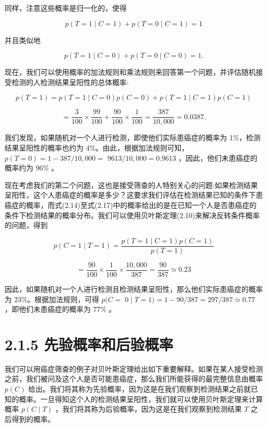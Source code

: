 \documentclass[10pt]{article}
\begin{document}
同样，注意这些概率是归一化的，使得

\[
p\left( {T = 1 \mid  C = 1}\right)  + p\left( {T = 0 \mid  C = 1}\right)  = 1 \tag{2.18}
\]

并且类似地

\[
p\left( {T = 1 \mid  C = 0}\right)  + p\left( {T = 0 \mid  C = 0}\right)  = 1. \tag{2.19}
\]

现在，我们可以使用概率的加法规则和乘法规则来回答第一个问题，并评估随机接受检测的人检测结果呈阳性的总体概率:

\[
p\left( {T = 1}\right)  = p\left( {T = 1 \mid  C = 0}\right) p\left( {C = 0}\right)  + p\left( {T = 1 \mid  C = 1}\right) p\left( {C = 1}\right)
\]

\[
= \frac{3}{100} \times  \frac{99}{100} + \frac{90}{100} \times  \frac{1}{100} = \frac{387}{{10},{000}} = {0.0387}. \tag{2.20}
\]

我们发现，如果随机对一个人进行检测，即使他们实际患癌症的概率为 1\%，检测结果呈阳性的概率也约为 4\%。由此，根据加法规则可知， \(p\left( {T = 0}\right)  = 1 - {387}/{10},{000} =\)  \({9613}/{10},{000} = {0.9613}\) ，因此，他们未患癌症的概率约为 \({96}\%\) 。

现在考虑我们的第二个问题，这也是接受筛查的人特别关心的问题:如果检测结果呈阳性，这个人患癌症的概率是多少？这要求我们评估在检测结果已知的条件下患癌症的概率，而式(2.14)至式(2.17)中的概率给出的是在已知一个人是否患癌症的条件下检测结果的概率分布。我们可以使用贝叶斯定理(2.10)来解决反转条件概率的问题，得到

\[
p\left( {C = 1 \mid  T = 1}\right)  = \frac{p\left( {T = 1 \mid  C = 1}\right) p\left( {C = 1}\right) }{p\left( {T = 1}\right) } \tag{2.21}
\]

\[
= \frac{90}{100} \times  \frac{1}{100} \times  \frac{{10},{000}}{387} = \frac{90}{387} \simeq  {0.23} \tag{2.22}
\]

因此，如果随机对一个人进行检测且检测结果呈阳性，那么他们实际患癌症的概率为 23\%。根据加法规则，可得 \(p(C =\)  \(0 \mid  T = 1) = 1 - {90}/{387} = {297}/{387} \simeq  {0.77}\) ，即他们未患癌症的概率为 \({77}\%\) 。

\section*{2.1.5 先验概率和后验概率}

我们可以用癌症筛查的例子对贝叶斯定理给出如下重要解释。如果在某人接受检测之前，我们被问及这个人是否可能患癌症，那么我们所能获得的最完整信息由概率 \(p\left( C\right)\) 给出。我们将其称为先验概率，因为这是在我们观察到检测结果之前就已知的概率。一旦得知这个人的检测结果呈阳性，我们就可以使用贝叶斯定理来计算概率 \(p\left( {C \mid  T}\right)\) ，我们将其称为后验概率，因为这是在我们观察到检测结果 \(T\) 之后得到的概率。
\end{document}
